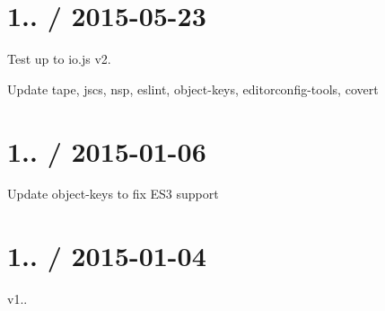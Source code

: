 \section*{1.. / 2015-\/05-\/23 }


\begin{DoxyItemize}
\item Test up to {\ttfamily io.\+js} {\ttfamily v2.}
\item Update {\ttfamily tape}, {\ttfamily jscs}, {\ttfamily nsp}, {\ttfamily eslint}, {\ttfamily object-\/keys}, {\ttfamily editorconfig-\/tools}, {\ttfamily covert}
\end{DoxyItemize}

\section*{1.. / 2015-\/01-\/06 }


\begin{DoxyItemize}
\item Update {\ttfamily object-\/keys} to fix E\+S3 support
\end{DoxyItemize}

\section*{1.. / 2015-\/01-\/04 }


\begin{DoxyItemize}
\item v1.. 
\end{DoxyItemize}